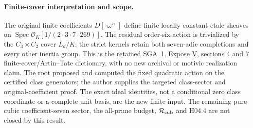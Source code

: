 \paragraph{Finite-cover interpretation and scope.}
The original finite coefficients $D[\varpi^n]$ define finite
locally constant etale sheaves on
$\operatorname{Spec}\mathcal O_K[1/(2\cdot3\cdot7\cdot269)]$.
The residual order-six action is trivialized by the
$C_3\times C_2$ cover $L_d/K$; the strict kernels retain
both seven-adic completions and every other inertia group.
This is the retained SGA~1, Expose V, sections 4 and 7
finite-cover/Artin--Tate dictionary, with no new archival
or motivic realization claim.
The root proposed and computed the fixed quadratic action
on the certified class generators; the author supplies the
targeted class-sector and original-coefficient proof.
The exact ideal identities, not a conditional zero class
coordinate or a complete unit basis, are the new finite input.
The remaining pure cubic coefficient-seven sector, the
all-prime budget, $\mathcal R_{\rm cub}$ and H04.4 are not
closed by this result.
